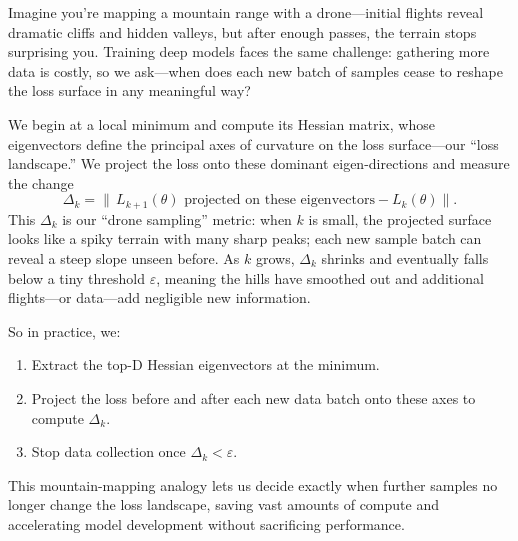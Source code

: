 \documentclass{article}
\begin{document}
  Imagine you’re mapping a mountain range with a drone—initial flights reveal dramatic cliffs and hidden valleys, but after enough passes, the terrain stops surprising you. Training deep models faces the same challenge: gathering more data is costly, so we ask—when does each new batch of samples cease to reshape the loss surface in any meaningful way?

  We begin at a local minimum and compute its Hessian matrix, whose eigenvectors define the principal axes of curvature on the loss surface—our “loss landscape.” We project the loss onto these dominant eigen-directions and measure the change
  \[
    \Delta_k = \bigl\|\,L_{k+1}(\theta)\text{ projected on these eigenvectors} - L_k(\theta)\bigr\|.
  \]
  This \(\Delta_k\) is our “drone sampling” metric: when \(k\) is small, the projected surface looks like a spiky terrain with many sharp peaks; each new sample batch can reveal a steep slope unseen before. As \(k\) grows, \(\Delta_k\) shrinks and eventually falls below a tiny threshold \(\varepsilon\), meaning the hills have smoothed out and additional flights—or data—add negligible new information.

  So in practice, we:
  \begin{enumerate}
    \item Extract the top-D Hessian eigenvectors at the minimum.
    \item Project the loss before and after each new data batch onto these axes to compute \(\Delta_k\).
    \item Stop data collection once \(\Delta_k < \varepsilon\).
  \end{enumerate}

  This mountain-mapping analogy lets us decide exactly when further samples no longer change the loss landscape, saving vast amounts of compute and accelerating model development without sacrificing performance.
\end{document}
